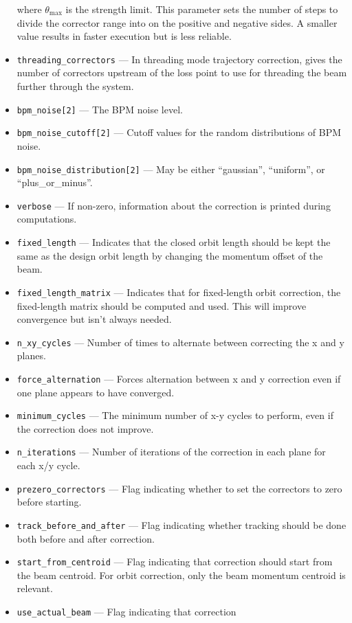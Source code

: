 \documentclass[11pt]{article}
\begin{document}
\begin{itemize}
  where $\theta_{\textrm{max}}$ is the strength limit.
  This parameter sets the number of steps to divide the corrector range into on the positive and negative sides.
  A smaller value results in faster execution but is less reliable.
\item \verb|threading_correctors| --- In threading mode trajectory correction, gives the number of correctors upstream of the loss point to
  use for threading the beam further through the system.
\item \verb|bpm_noise[2]| --- The BPM noise level. 
\item \verb|bpm_noise_cutoff[2]| --- Cutoff values for the random distributions of BPM noise.
\item \verb|bpm_noise_distribution[2]| --- May be either ``gaussian'', ``uniform'', or ``plus\_or\_minus''.
\item \verb|verbose| --- If non-zero, information about the correction is printed during computations.
\item \verb|fixed_length| --- Indicates that the closed orbit length should be kept the same as the design orbit
length by changing the momentum offset of the beam.
\item \verb|fixed_length_matrix| --- Indicates that for fixed-length orbit correction, the fixed-length
matrix should be computed and used.  This will improve convergence but isn't always needed.
\item \verb|n_xy_cycles| --- Number of times to alternate between correcting the x and y planes.
\item \verb|force_alternation| --- Forces alternation between x and y correction even if one plane appears to 
  have converged.
\item \verb|minimum_cycles| --- The minimum number of x-y cycles to perform, even if the correction does not improve.
\item \verb|n_iterations| --- Number of iterations of the correction in each plane for each x/y cycle.
\item \verb|prezero_correctors| --- Flag indicating whether to set the correctors to zero before starting.
\item \verb|track_before_and_after| --- Flag indicating whether tracking should be done both before and after
correction.
\item \verb|start_from_centroid| --- Flag indicating that correction
should start from the beam centroid.  For orbit correction, only the
beam momentum centroid is relevant.
\item \verb|use_actual_beam| --- Flag indicating that correction

\end{itemize}
\end{document}
